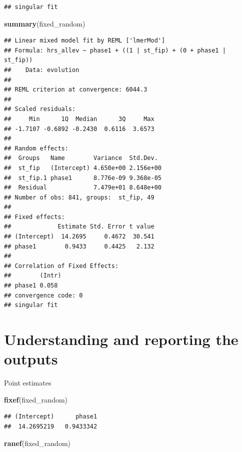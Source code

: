 \documentclass[]{book}
\newenvironment{Shaded}{\begin{snugshade}}{\end{snugshade}}
\newcommand{\KeywordTok}[1]{\textcolor[rgb]{0.13,0.29,0.53}{\textbf{#1}}}
\newcommand{\NormalTok}[1]{#1}
\begin{document}
\begin{verbatim}
## singular fit
\end{verbatim}

\begin{Shaded}
\begin{Highlighting}[]
\KeywordTok{summary}\NormalTok{(fixed_random)}
\end{Highlighting}
\end{Shaded}

\begin{verbatim}
## Linear mixed model fit by REML ['lmerMod']
## Formula: hrs_allev ~ phase1 + ((1 | st_fip) + (0 + phase1 | st_fip))
##    Data: evolution
## 
## REML criterion at convergence: 6044.3
## 
## Scaled residuals: 
##     Min      1Q  Median      3Q     Max 
## -1.7107 -0.6892 -0.2430  0.6116  3.6573 
## 
## Random effects:
##  Groups   Name        Variance  Std.Dev. 
##  st_fip   (Intercept) 4.650e+00 2.156e+00
##  st_fip.1 phase1      8.776e-09 9.368e-05
##  Residual             7.479e+01 8.648e+00
## Number of obs: 841, groups:  st_fip, 49
## 
## Fixed effects:
##             Estimate Std. Error t value
## (Intercept)  14.2695     0.4672  30.541
## phase1        0.9433     0.4425   2.132
## 
## Correlation of Fixed Effects:
##        (Intr)
## phase1 0.058 
## convergence code: 0
## singular fit
\end{verbatim}

\chapter{Understanding and reporting the
outputs}\label{understanding-and-reporting-the-outputs}

Point estimates

\begin{Shaded}
\begin{Highlighting}[]
\KeywordTok{fixef}\NormalTok{(fixed_random)}
\end{Highlighting}
\end{Shaded}

\begin{verbatim}
## (Intercept)      phase1 
##  14.2695219   0.9433342
\end{verbatim}

\begin{Shaded}
\begin{Highlighting}[]
\KeywordTok{ranef}\NormalTok{(fixed_random)}
\end{Highlighting}
\end{Shaded}
\end{document}
